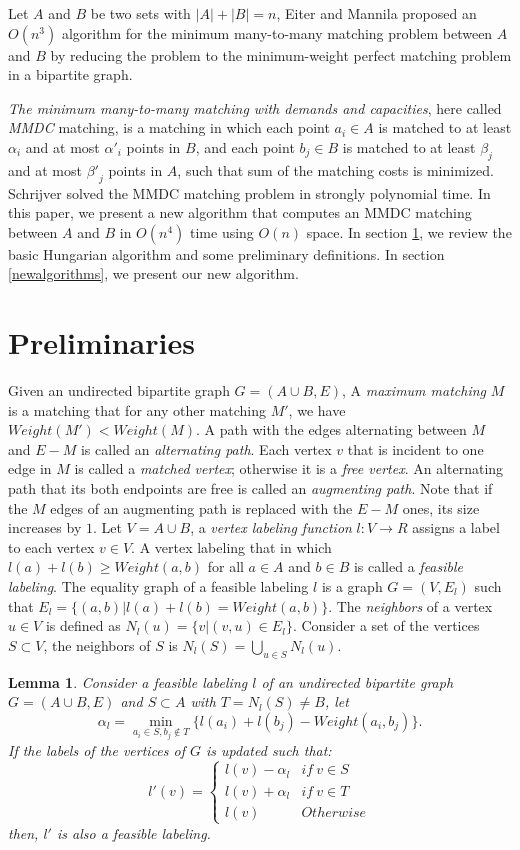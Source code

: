 \documentclass[preprint,12pt]{elsarticle}
\begin{document}
Let $A$ and $B$ be two sets with $|A|+|B|=n$, Eiter and Mannila \cite{6} proposed an $O(n^3)$ algorithm for the minimum many-to-many matching problem between $A$ and $B$ by reducing the problem to the minimum-weight perfect matching problem in a bipartite graph. 

\textit {The minimum many-to-many matching with demands and capacities}, here called \textit {MMDC} matching, is a matching in which each point $a_i\in A$ is matched to at least $\alpha_i$ and at most ${\alpha '}_i$ points in $B$, and each point $b_j\in B$ is matched to at least $\beta_j$ and at most ${\beta '}_j$ points in $A$, such that sum of the matching costs is minimized.
Schrijver \cite{7} solved the MMDC matching problem in strongly polynomial time. In this paper, we present a new algorithm that computes an MMDC matching between $A$ and $B$ in $O(n^4)$ time using $O(n)$ space. In section \ref{Preliminaries}, we review the basic Hungarian algorithm and some preliminary definitions. In section \ref{newalgorithms}, we present our new algorithm. 

\section {Preliminaries}
\label{Preliminaries}
Given an undirected bipartite graph $G=(A \cup B, E)$, A \textit {maximum matching} $M$ is a matching that for any other matching $M'$, we have $Weight(M') < Weight(M)$. A path with the edges alternating between $M$ and $E-M$ is called an \textit {alternating path}. Each vertex $v$ that is incident to one edge in $M$ is called a \textit {matched vertex}; otherwise it is a \textit {free vertex}. An alternating path that its both endpoints are free is called an \textit {augmenting path}. Note that if the $M$ edges of an augmenting path is replaced with the $E-M$ ones, its size increases by $1$. Let $V=A \cup B$, a \textit {vertex labeling function} $l: V \rightarrow R$ assigns a label to each vertex $v \in V$. A vertex labeling that in which $l(a)+l(b) \ge Weight(a,b)$ for all $a \in A$ and $b \in B$ is called a \textit {feasible labeling}. The equality graph of a feasible labeling $l$ is a graph $G=(V,E_l)$ such that $E_l=\{(a,b)| l(a)+l(b)=Weight(a,b)\}$. The \textit {neighbors} of a vertex $u \in V$ is defined as $N_l(u)=\{v| (v,u) \in E_l\}$. Consider a set of the vertices $S \subset V$, the neighbors of $S$ is $N_l(S)=\bigcup_{u \in S} N_l(u)$.
\newtheorem{lemma}{Lemma}
\begin{lemma}
\label{lem1}
Consider a feasible labeling $l$ of an undirected bipartite graph $G=(A\cup B, E)$ and $S \subset A$  with $T=N_l(S)\neq B$, let 
$$\alpha_l=\min_{a_i \in S, b_j \notin T}\{l(a_i)+l(b_j)-Weight(a_i,b_j)\}.$$ If the labels of the vertices of $G$ is updated such that:
$$l'(v)=\left\{ 
\begin{array}{lr}
l(v)-\alpha_l & if \  v \in S 
 \\ 
 l(v)+\alpha_l & if\  v  \in T 
 \\ 
 l(v) & Otherwise 
 \end{array}
\right.$$ 
then, $l'$ is also a feasible labeling.
\end{lemma}
\end{document}
